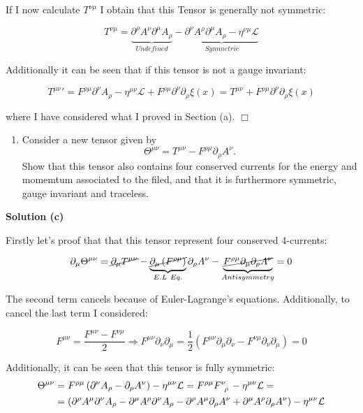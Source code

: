 \documentclass[12pt]{article}
\newcommand{\qedwhite}{\hfill \ensuremath{\Box}}
\begin{document}
\newpage
If I now calculate \( T^{\nu\mu} \) I obtain that this Tensor is generally not symmetric:

\[T^{\nu\mu} = \underbrace{\partial^\rho A^\nu \partial^\mu A_\rho}_{Undefined} - \underbrace{\partial^\nu A^\rho \partial^\mu A_\rho - \eta^{\nu\mu}\mathcal{L}}_{Symmetric}\]

Additionally it can be seen that if this tensor is not a gauge invariant:

\[ {T^{\mu\nu}}' = F^{\rho\mu} \partial^\nu A_\rho - \eta^{\mu\nu} \mathcal{L} + F^{\rho\mu} \partial^\nu \partial_\rho \xi(x) = T^{\mu\nu} + F^{\rho\mu} \partial^\nu \partial_\rho \xi(x)\]

where I have considered what I proved in Section (a). \qedwhite

\color{black}

\begin{enumerate}[label=(\alph*), start = 3]
    \item Consider a new tensor given by \[ \Theta^{\mu\nu} = T^{\mu\nu} - F^{\rho\mu} \partial_\rho A^\nu. \] Show that this tensor also contains four conserved currents for the energy and momemtum associated to the filed, and that it is furthermore symmetric, gauge invariant and traceless.
\end{enumerate}

\color{blue}

\textbf{Solution (c)}

Firstly let's proof that that this tensor represent four conserved 4-currents:

\[ \partial_\mu \Theta^{\mu\nu} = \cancel{ \partial_\mu T^{\mu\nu} } - \underbrace{ \cancel{ \partial_\mu \left(F^{\rho\mu}\right) } }_{E.L~Eq.} \partial_\rho A^\nu - \underbrace{ \cancel{ F^{\rho\mu} \partial_\mu \partial_\rho A^\nu } }_{Antisymmetry} = 0 \]

The second term cancels because of Euler-Lagrange's equations. Additionally, to cancel the last term I considered:

\[
    F^{\mu\nu} = \frac{ F^{\mu\nu} - F^{\nu\mu} }{2} \Longrightarrow F^{\mu\nu}\partial_\nu\partial_\mu = \frac{1}{2} \left( F^{\mu\nu} \partial_\mu \partial_\nu - F^{\nu\mu} \partial_\nu \partial_\mu \right) = 0
\]

Additionally, it can be seen that this tensor is fully symmetric:
\begin{align*}
    \Theta^{\mu\nu} &= F^{\rho\mu} \left( \partial^\nu A_\rho - \partial_\rho A^\nu \right) - \eta^{\mu\nu} \mathcal{L} = F^{\rho\mu} \tensor{F}{^\nu_\rho} - \eta^{\mu\nu} \mathcal{L} = \\
                    &= \left( \partial^\rho A^\mu \partial^\nu A_\rho - \partial^\mu A^\rho \partial^\nu A_\rho - \partial^\rho A^\mu \partial_\rho A^\nu + \partial^\mu A^\rho \partial_\rho A^\nu \right) - \eta^{\mu\nu} \mathcal{L}
\end{align*}
\end{document}

